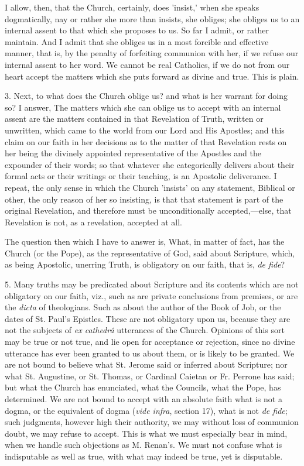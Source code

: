 I allow, then, that the Church, certainly, does
'insist,' when she speaks dogmatically, nay or rather she more than
insists, she obliges; she obliges us to an internal assent to that
which she proposes to us. So far I admit, or rather maintain. And I
admit that she obliges us in a most forcible and effective manner,
that is, by the penalty of forfeiting communion with her, if we refuse
our internal assent to her word. We cannot be real Catholics, if we do
not from our heart accept the matters which she puts forward as divine
and true. This is plain.

3. Next, to what does the Church oblige us? and
what is her warrant for doing so? I answer, The matters which she can
oblige us to accept with an internal assent are the matters contained
in that Revelation of Truth, written or unwritten, which came to the
world from our Lord and His Apostles; and this claim on our faith in
her decisions as to the matter of that Revelation rests on her being
the divinely appointed representative of the Apostles and the
expounder of their words; so that whatever she categorically delivers
about their formal acts or their writings or their teaching, is an
Apostolic deliverance. I repeat, the only sense in which the Church
'insists' on any statement, Biblical or other, the only reason of her
so insisting, is that that statement is part of the original
Revelation, and therefore must be unconditionally accepted,—else,
that Revelation is not, as a revelation, accepted at all.

The question then which I have to answer is,
What, in matter of fact, has the Church (or the Pope), as the
representative of God, said about Scripture, which, as being
Apostolic, unerring Truth, is obligatory on our faith, that is, \emph{de
fide}?

5. Many truths may be predicated about Scripture
and its contents which are not obligatory on our faith, viz., such as
are private conclusions from premises, or are the \emph{dicta} of
theologians. Such as about the author of the Book of Job, or the dates
of St. Paul's Epistles. These are not obligatory upon us, because they
are not the subjects of \emph{ex cathedrâ} utterances of the Church.
Opinions of this sort may be true or not true, and lie open for
acceptance or rejection, since no divine utterance has ever been
granted to us about them, or is likely to be granted. We are not
bound to believe what St. Jerome said or inferred about Scripture; nor
what St. Augustine, or St. Thomas, or Cardinal Caietan or Fr. Perrone
has said; but what the Church has enunciated, what the Councils, what
the Pope, has determined. We are not bound to accept with an absolute
faith what is not a dogma, or the equivalent of dogma (\emph{vide infra},
section 17), what is not \emph{de fide}; such judgments, however high
their authority, we may without loss of communion doubt, we may refuse
to accept. This is what we must especially bear in mind, when we
handle such objections as M. Renan's. We must not confuse what is
indisputable as well as true, with what may indeed be true, yet is
disputable.

